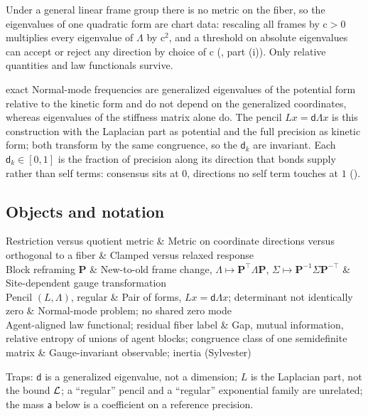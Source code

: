 Under a general linear frame group there is no metric on the fiber, so the eigenvalues of one quadratic
form are chart data: rescaling all frames by \(\mathrm c>0\) multiplies every eigenvalue of \(\Lambda\) by
\(\mathrm c^2\), and a threshold on absolute eigenvalues can accept or reject any direction by choice of
\(\mathrm c\) (, part (i)). Only relative quantities and
law functionals survive.

\begin{analogy}{exact}
Normal-mode frequencies are generalized eigenvalues of the potential form relative to the kinetic form
and do not depend on the generalized coordinates, whereas eigenvalues of the stiffness matrix alone do.
The pencil \(Lx=\mathsf d\Lambda x\) is this construction with the Laplacian part as potential and the
full precision as kinetic form; both transform by the same congruence, so the \(\mathsf d_k\) are
invariant. Each \(\mathsf d_k\in[0,1]\) is the fraction of precision along its direction that bonds supply
rather than self terms: consensus sits at \(0\), directions no self term touches at \(1\)
().
\end{analogy}

\subsection{Objects and notation}

\begin{decoder}
Restriction versus quotient metric & Metric on coordinate directions versus orthogonal to a fiber & Clamped versus relaxed response\\
Block reframing \(\mathbf P\) & New-to-old frame change, \(\Lambda\mapsto\mathbf P^\top\Lambda\mathbf P\), \(\Sigma\mapsto\mathbf P^{-1}\Sigma\mathbf P^{-\top}\) & Site-dependent gauge transformation\\
Pencil \((L,\Lambda)\), regular & Pair of forms, \(Lx=\mathsf d\Lambda x\); determinant not identically zero & Normal-mode problem; no shared zero mode\\
Agent-aligned law functional; residual fiber label & Gap, mutual information, relative entropy of unions of agent blocks; congruence class of one semidefinite matrix & Gauge-invariant observable; inertia (Sylvester)\\
\end{decoder}

Traps: \(\mathsf d\) is a generalized eigenvalue, not a dimension; \(L\) is the Laplacian part, not the
bound \(\mathcal L\); a ``regular'' pencil and a ``regular'' exponential family are unrelated; the mass
\(\mathsf a\) below is a coefficient on a reference precision.

